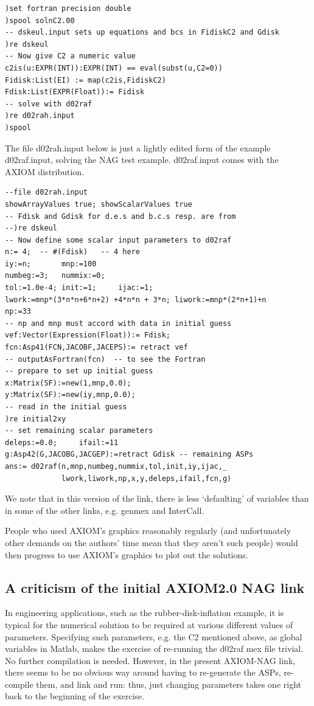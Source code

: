 \begin{verbatim}
)set fortran precision double
)spool solnC2.00
-- dskeul.input sets up equations and bcs in FidiskC2 and Gdisk
)re dskeul
-- Now give C2 a numeric value
c2is(u:EXPR(INT)):EXPR(INT) == eval(subst(u,C2=0))
Fidisk:List(EI) := map(c2is,FidiskC2)
Fdisk:List(EXPR(Float)):= Fidisk
-- solve with d02raf
)re d02rah.input
)spool
\end{verbatim}

The file d02rah.input below is just a lightly edited
form of the example d02raf.input, solving the NAG test example.
d02raf.input comes with the AXIOM distribution.
\begin{verbatim}
--file d02rah.input
showArrayValues true; showScalarValues true
-- Fdisk and Gdisk for d.e.s and b.c.s resp. are from
--)re dskeul
-- Now define some scalar input parameters to d02raf
n:= 4;  -- #(Fdisk)   -- 4 here
iy:=n;       mnp:=100
numbeg:=3;   nummix:=0;
tol:=1.0e-4; init:=1;     ijac:=1;
lwork:=mnp*(3*n*n+6*n+2) +4*n*n + 3*n; liwork:=mnp*(2*n+1)+n
np:=33
-- np and mnp must accord with data in initial guess
vef:Vector(Expression(Float)):= Fdisk;
fcn:Asp41(FCN,JACOBF,JACEPS):= retract vef
-- outputAsFortran(fcn)  -- to see the Fortran
-- prepare to set up initial guess
x:Matrix(SF):=new(1,mnp,0.0);
y:Matrix(SF):=new(iy,mnp,0.0);
-- read in the initial guess
)re initial2xy
-- set remaining scalar parameters
deleps:=0.0;     ifail:=11
g:Asp42(G,JACOBG,JACGEP):=retract Gdisk -- remaining ASPs
ans:= d02raf(n,mnp,numbeg,nummix,tol,init,iy,ijac,_
             lwork,liwork,np,x,y,deleps,ifail,fcn,g)
\end{verbatim}


We note that in this version of the link, there is less
`defaulting' of variables than in some of the other links,
e.g. genmex and InterCall.

People who used AXIOM's graphics reasonably regularly
(and unfortunately other demands on the authors' time mean
that they aren't such people) would then progress
to use AXIOM's graphics to plot out the solutions.

\subsection*{A criticism of the initial AXIOM2.0 NAG link}

In engineering applications, such as the rubber-disk-inflation
example, it is typical for the numerical solution to be required at
various different values of parameters.
Specifying such parameters, e.g. the C2 mentioned above,
as global variables in Matlab, makes the exercise of
re-running the d02raf mex file trivial.
No further compilation is needed.
However, in the present AXIOM-NAG link, there seems
to be no obvious way around having to re-generate
the ASPs, re-compile them, and link and run:
thus, just changing parameters takes one right back to
the beginning of the exercise.


